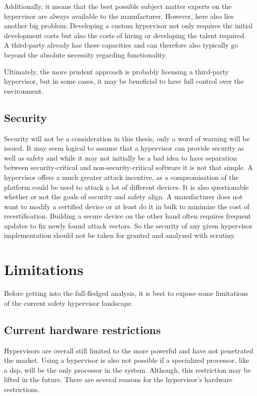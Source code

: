 Additionally, it means that the best possible subject matter experts on the hypervisor are always available to the manufacturer. However, here also lies another big problem: Developing a custom hypervisor not only requires the initial development costs but also the costs of hiring or developing the talent required. A third-party already has these capacities and can therefore also typically go beyond the absolute necessity regarding functionality.

Ultimately, the more prudent approach is probably licensing a third-party hypervisor, but in some cases, it may be beneficial to have full control over the environment. 

\subsection{Security}
Security will not be a consideration in this thesis, only a word of warning will be issued. It may seem logical to assume that a hypervisor can provide security as well as safety and while it may not initially be a bad idea to have separation between security-critical and non-security-critical software it is not that simple. A hypervisor offers a much greater attack incentive, as a compromisation of the platform could be used to attack a lot of different devices. It is also questionable whether or not the goals of security and safety align. A manufacturer does not want to modify a certified device or at least do it in bulk to minimize the cost of recertification. Building a secure device on the other hand often requires frequent updates to fix newly found attack vectors. So the security of any given hypervisor implementation should not be taken for granted and analyzed with scrutiny.

\section{Limitations}
Before getting into the full-fledged analysis, it is best to expose some limitations of the current safety hypervisor landscape. 
\subsection{Current hardware restrictions}
Hypervisors are overall still limited to the more powerful  and have not penetrated the  market. Using a hypervisor is also not possible if a specialized processor, like a \acrfull{dsp}, will be the only processor in the system. Although, this restriction may be lifted in the future.  There are several reasons for the hypervisor's hardware restrictions. 

